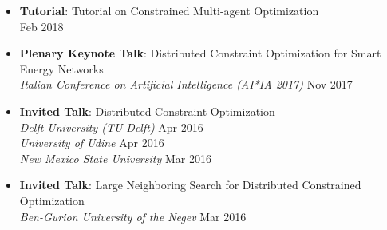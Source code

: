 \begin{itemize}





	\item {\bf Tutorial}: {Tutorial on Constrained Multi-agent Optimization}\\
  	\hfill {Feb 2018}

	\item {\bf Plenary Keynote Talk}: 
	Distributed Constraint Optimization for Smart Energy Networks\\
    {\em Italian Conference on Artificial Intelligence (AI*IA 2017)}
	\hfill {Nov 2017}

	\item {\bf Invited Talk}: Distributed Constraint Optimization\\
	{\em Delft University (TU Delft)} \hfill {Apr 2016}\\
 	{\em University of Udine} \hfill {Apr 2016} \\ 
	{\em New Mexico State University} \hfill {Mar 2016}
	
	\item {\bf Invited Talk}: Large Neighboring Search for Distributed Constrained Optimization\\
	{\em Ben-Gurion University of the Negev} \hfill {Mar 2016}
\end{itemize}
